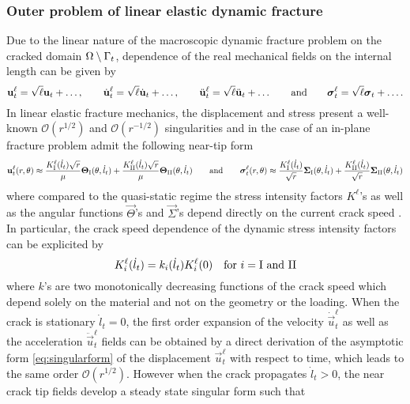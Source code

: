 \subsubsection{Outer problem of linear elastic dynamic fracture}
Due to the linear nature of the macroscopic dynamic fracture problem on the cracked domain ${\Omega\setminus\Gamma_t}$, dependence of the real mechanical fields on the internal length can be given by
\begin{equation} \label{eq:dependenceell}
\vec{u}_t^\ell=\sqrt{\ell}\vec{u}_t+\ldots,\qquad\dot{\vec{u}}^\ell_t=\sqrt{\ell}\dot{\vec{u}}_t+\ldots,\qquad\ddot{\vec{u}}^\ell_t=\sqrt{\ell}\ddot{\vec{u}}_t+\ldots\qquad\text{and}\qquad\sig_t^\ell=\sqrt{\ell}\sig_t+\ldots.
\end{equation}
In linear elastic fracture mechanics, the displacement and stress present a well-known $\mathcal{O}(r^{1/2})$ and $\mathcal{O}(r^{-1/2})$ singularities and in the case of an in-plane fracture problem admit the following near-tip form
\begin{equation} \label{eq:singularform}
\vec{u}_t^\ell(r,\theta)\approx\frac{K_\RN{1}^\ell(\dot{l}_t)\sqrt{r}}{\mu}\vec{\Theta}_\RN{1}(\theta,\dot{l}_t)+\frac{K_\RN{2}^\ell(\dot{l}_t)\sqrt{r}}{\mu}\vec{\Theta}_\RN{2}(\theta,\dot{l}_t)\qquad\text{and}\qquad\sig_t^\ell(r,\theta)\approx\frac{K_\RN{1}^\ell(\dot{l}_t)}{\sqrt{r}}\vec{\Sigma}_\RN{1}(\theta,\dot{l}_t)+\frac{K_\RN{2}^\ell(\dot{l}_t)}{\sqrt{r}}\vec{\Sigma}_\RN{2}(\theta,\dot{l}_t)
\end{equation}
where compared to the quasi-static regime the stress intensity factors $K^\ell$'s as well as the angular functions $\vec{\Theta}$'s and $\vec{\Sigma}$'s depend directly on the current crack speed \cite{Freund:1990}. In particular, the crack speed dependence of the dynamic stress intensity factors can be explicited by
\[
K_i^\ell(\dot{l}_t)=k_i(\dot{l}_t)K_i^\ell(0)\quad\text{for $i=\RN{1}$ and \RN{2}}
\]
where $k$'s are two monotonically decreasing functions of the crack speed which depend solely on the material and not on the geometry or the loading. When the crack is stationary $\dot{l}_t=0$, the first order expansion of the velocity $\dot{\vec{u}}_t^\ell$ as well as the acceleration $\ddot{\vec{u}}_t^\ell$ fields can be obtained by a direct derivation of the asymptotic form \eqref{eq:singularform} of the displacement $\vec{u}_t^\ell$ with respect to time, which leads to the same order $\mathcal{O}(r^{1/2})$. However when the crack propagates $\dot{l}_t>0$, the near crack tip fields develop a steady state singular form \cite{Freund:1990} such that
